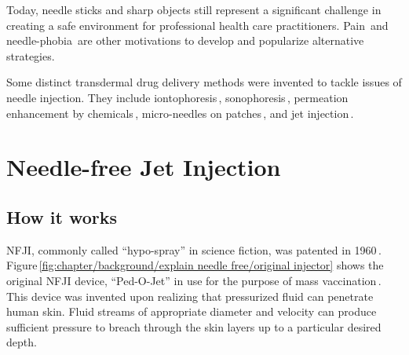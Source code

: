     Today, needle sticks and sharp objects still represent a significant challenge in creating a safe environment for professional health care practitioners. Pain\,\cite{schneider1994} and needle-phobia\,\cite{hamilton2005,Nir2003} are other motivations to develop and popularize alternative strategies.
    
    Some distinct transdermal drug delivery methods were invented to tackle issues of needle injection. They include iontophoresis\,\cite{dhote2012}, sonophoresis\,\cite{bommanan1992}, permeation enhancement by chemicals\,\cite{karande2006}, micro-needles on patches\,\cite{cormier2004}, and jet injection\,\cite{taberner2006}. 

\section{Needle-free Jet Injection}                 \label{Chapter:background/needle-free jet injection}
    
    
    \subsection{How it works}                       \label{Chapter:background/needle-free jet injection/how it works}
    
        \ac{NFJI}, commonly called “hypo-spray” in science fiction, was patented in 1960\,\cite{ismach1962}. Figure\,\ref{fig:chapter/background/explain needle free/original injector} shows the original \acs{NFJI} device, “Ped-O-Jet” in use for the purpose of mass vaccination\,\cite{DictionnairesetEncyclopediessurAcademic}. This device was invented  upon realizing that pressurized fluid can penetrate human skin. Fluid streams of appropriate diameter and velocity can produce sufficient pressure to breach through the skin layers up to a particular desired depth. 
        
